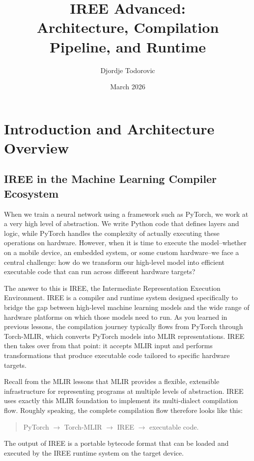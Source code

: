 \documentclass[11pt,a4paper]{article}
\title{IREE Advanced:\\
Architecture, Compilation Pipeline, and Runtime}
\author{Djordje Todorovic}
\date{March 2026}
\begin{document}
\maketitle

\tableofcontents
\newpage

\section{Introduction and Architecture Overview}

\subsection{IREE in the Machine Learning Compiler Ecosystem}

When we train a neural network using a framework such as PyTorch, we work at a very high level of abstraction. We write Python code that defines layers and logic, while PyTorch handles the complexity of actually executing these operations on hardware. However, when it is time to execute the model--whether on a mobile device, an embedded system, or some custom hardware--we face a central challenge: how do we transform our high-level model into efficient executable code that can run across different hardware targets?

The answer to this is IREE, the Intermediate Representation Execution Environment. IREE is a compiler and runtime system designed specifically to bridge the gap between high-level machine learning models and the wide range of hardware platforms on which those models need to run. As you learned in previous lessons, the compilation journey typically flows from PyTorch through Torch-MLIR, which converts PyTorch models into MLIR representations. IREE then takes over from that point: it accepts MLIR input and performs transformations that produce executable code tailored to specific hardware targets.

Recall from the MLIR lessons that MLIR provides a flexible, extensible infrastructure for representing programs at multiple levels of abstraction. IREE uses exactly this MLIR foundation to implement its multi-dialect compilation flow. Roughly speaking, the complete compilation flow therefore looks like this:

\begin{quote}
PyTorch \(\rightarrow\) Torch-MLIR \(\rightarrow\) IREE \(\rightarrow\) executable code.
\end{quote}

The output of IREE is a portable bytecode format that can be loaded and executed by the IREE runtime system on the target device.
\end{document}
